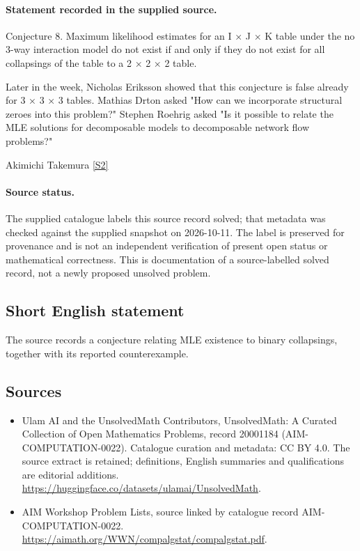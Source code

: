 \documentclass[11pt]{article}
\begin{document}
\paragraph{Statement recorded in the supplied source.}
Conjecture 8. Maximum likelihood estimates for an I × J × K table under the no 3-way interaction model do not exist if and only if they do not exist for all collapsings of the table to a 2 × 2 × 2 table.

Later in the week, Nicholas Eriksson showed that this conjecture is false already for 3 × 3 × 3 tables. Mathias Drton asked "How can we incorporate structural zeroes into this problem?" Stephen Roehrig asked "Is it possible to relate the MLE solutions for decomposable models to decomposable network flow problems?"

Akimichi Takemura \href{https://aimath.org/WWN/compalgstat/compalgstat.pdf}{[S2]}
\paragraph{Source status.}
The supplied catalogue labels this source record solved; that metadata was checked against the supplied snapshot on 2026-10-11. The label is preserved for provenance and is not an independent verification of present open status or mathematical correctness. This is documentation of a source-labelled solved record, not a newly proposed unsolved problem.
\subsection{Short English statement}
The source records a conjecture relating MLE existence to binary collapsings, together with its reported counterexample.
\subsection{Sources}
\begin{itemize}
\item[S1] Ulam AI and the UnsolvedMath Contributors, UnsolvedMath: A Curated Collection of Open Mathematics Problems, record 20001184 (AIM-COMPUTATION-0022). Catalogue curation and metadata: CC BY 4.0. The source extract is retained; definitions, English summaries and qualifications are editorial additions.
\url{https://huggingface.co/datasets/ulamai/UnsolvedMath}.
\item[S2] AIM Workshop Problem Lists, source linked by catalogue record AIM-COMPUTATION-0022.
\url{https://aimath.org/WWN/compalgstat/compalgstat.pdf}.
\end{itemize}
\end{document}
